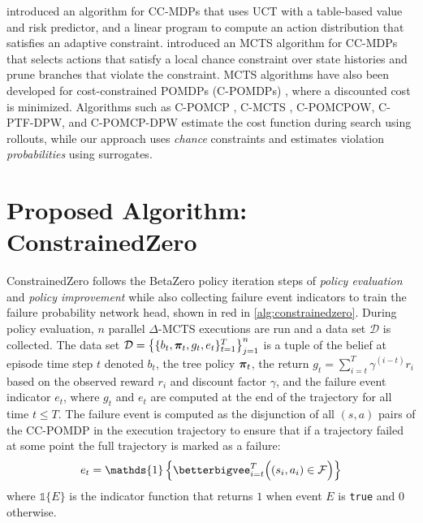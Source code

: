 \textcite{brazdil2020reinforcement} introduced an algorithm for CC-MDPs that uses UCT with a table-based value and risk predictor, and a linear program to compute an action distribution that satisfies an adaptive constraint.
\textcite{ayton2018vulcan} introduced an MCTS algorithm for CC-MDPs that selects actions that satisfy a local chance constraint over state histories and prune branches that violate the constraint.
MCTS algorithms have also been developed for cost-constrained POMDPs (C-POMDPs) \cite{isom2008piecewise}, where a discounted cost is minimized.
Algorithms such as C-POMCP \cite{lee2018monte}, C-MCTS \cite{parthasarathy2023cmcts}, C-POMCPOW, C-PTF-DPW, and C-POMCP-DPW \cite{jamgochian2023online} estimate the cost function during search using rollouts, while our approach uses \textit{chance} constraints and estimates violation \textit{probabilities} using surrogates.


\section{Proposed Algorithm: ConstrainedZero}
ConstrainedZero follows the BetaZero policy iteration steps of \textit{policy evaluation} and \textit{policy improvement} while also collecting failure event indicators to train the failure probability network head, shown in red in \cref{alg:constrainedzero}.
During policy evaluation, $n$ parallel $\Delta$-MCTS executions are run and a data set $\mathcal{D}$ is collected.
The data set $\mathcal{D} = \big\{\{b_t, \boldsymbol\pi_t, g_t, e_t\}_{t=1}^T \big\}_{j=1}^n$ is a tuple of the belief at episode time step $t$ denoted $b_t$, the tree policy $\boldsymbol\pi_t$, the return $g_t = \sum_{i=t}^T \gamma^{(i-t)}r_i$ based on the observed reward $r_i$ and discount factor $\gamma$, and the failure event indicator $e_t$, where $g_t$ and $e_t$ are computed at the end of the trajectory for all time $t \le T$.
The failure event is computed as the disjunction of all $(s,a)$ pairs of the CC-POMDP in the execution trajectory to ensure that if a trajectory failed at some point the full trajectory is marked as a failure:
\begin{equation}
    e_t = \mathds{1} \left\{ \betterbigvee_{i=t}^T \Big( (s_i, a_i) \in \mathcal{F} \Big) \right\}
\end{equation}
where $\mathds{1}\{E\}$ is the indicator function that returns $1$ when event $E$ is \texttt{true} and $0$ otherwise.

